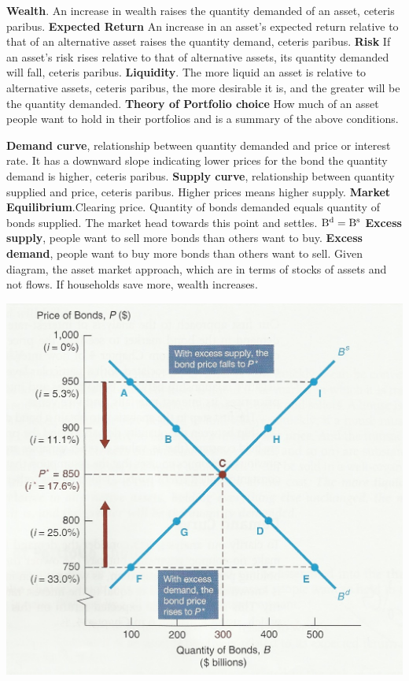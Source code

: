 \documentclass[12pt]{examnotes}
\begin{document}
\textbf{Wealth}. An increase in wealth raises the quantity demanded of an asset, ceteris paribus. 
\textbf{Expected Return} An increase in an asset's expected return relative to that of an alternative asset raises the quantity demand, ceteris paribus. 
\textbf{Risk} If an asset's risk rises relative to that of alternative assets, its quantity demanded will fall, ceteris paribus. 
\textbf{Liquidity}. The more liquid an asset is relative to alternative assets, ceteris paribus, the more desirable it is, and the greater will be the quantity demanded. 
\textbf{Theory of Portfolio choice} How much of an asset people want to hold in their portfolios and is a summary of the above conditions. 

\textbf{Demand curve}, relationship between quantity demanded and price or interest rate. It has a downward slope indicating lower prices for the bond the quantity demand is higher, ceteris paribus.
\textbf{Supply curve}, relationship between quantity supplied and price, ceteris paribus. Higher prices means higher supply.
\textbf{Market Equilibrium}.Clearing price. Quantity of bonds demanded equals quantity of bonds supplied. The market head towards this point and settles. $\rm{B^d}=\rm{B^s}$
\textbf{Excess supply}, people want to sell more bonds than others want to buy. \textbf{Excess demand}, people want to buy more bonds than others want to sell. 
Given diagram, the asset market approach, which are in terms of stocks of assets and not flows.
If households save more, wealth increases.

\begin{center}
  \includegraphics[scale=0.4]{./imgs/supplydemand.jpg}
\end{center}
\end{document}
